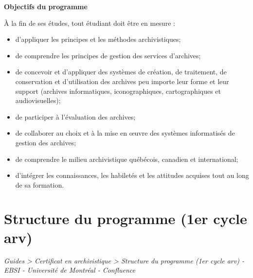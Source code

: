 \documentclass [12 pt]{article}
\begin{document}
        \textbf{
        Objectifs du programme
        }
    
            À la fin de ses études, tout étudiant doit être en mesure :
            
        \begin{itemize}
        
                
        \item d'appliquer les principes et les méthodes archivistiques;
                
        \item de comprendre les principes de gestion des services d'archives;
                
        \item de concevoir et d'appliquer des systèmes de création, de traitement, de
                    conservation et d'utilisation des archives peu importe leur forme et leur
                    support (archives informatiques, iconographiques, cartographiques et
                    audiovisuelles);
                
        \item de participer à l'évaluation des archives;
                
        \item de collaborer au choix et à la mise en œuvre des systèmes informatisés de
                    gestion des archives;
                
        \item de comprendre le milieu archivistique québécois, canadien et international;
                
        \item d'intégrer les connaissances, les habiletés et les attitudes acquises tout au
                    long de sa formation.
            
        \end{itemize}
    
        
    
    
        \newpage
        \section {
        Structure du programme (1er cycle arv)
        }
        
        
        
        \textit{
        Guides > Certificat en archivistique > Structure du programme (1er cycle arv) -
            EBSI - Université de Montréal - Confluence
        }
    
\end{document}
